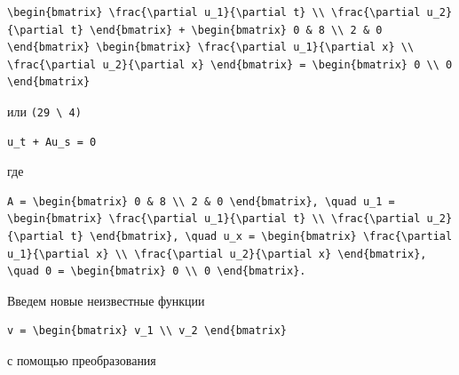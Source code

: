 \documentclass[
  ukrainian,
]{article}
\begin{document}
\begin{verbatim}
\begin{bmatrix} \frac{\partial u_1}{\partial t} \\ \frac{\partial u_2}{\partial t} \end{bmatrix} + \begin{bmatrix} 0 & 8 \\ 2 & 0 \end{bmatrix} \begin{bmatrix} \frac{\partial u_1}{\partial x} \\ \frac{\partial u_2}{\partial x} \end{bmatrix} = \begin{bmatrix} 0 \\ 0 \end{bmatrix}
\end{verbatim}

или \texttt{(29\ \textbackslash{}\ 4)}

\begin{verbatim}
u_t + Au_s = 0
\end{verbatim}

где

\begin{verbatim}
A = \begin{bmatrix} 0 & 8 \\ 2 & 0 \end{bmatrix}, \quad u_1 = \begin{bmatrix} \frac{\partial u_1}{\partial t} \\ \frac{\partial u_2}{\partial t} \end{bmatrix}, \quad u_x = \begin{bmatrix} \frac{\partial u_1}{\partial x} \\ \frac{\partial u_2}{\partial x} \end{bmatrix}, \quad 0 = \begin{bmatrix} 0 \\ 0 \end{bmatrix}.
\end{verbatim}

Введем новые неизвестные функции

\begin{verbatim}
v = \begin{bmatrix} v_1 \\ v_2 \end{bmatrix}
\end{verbatim}

с помощью преобразования
\end{document}
